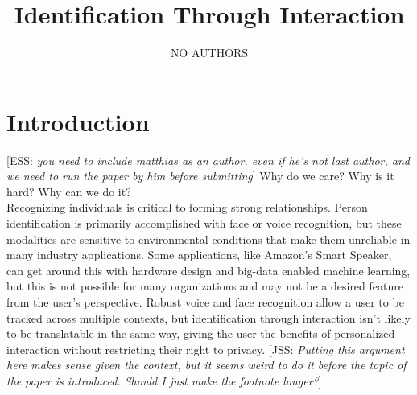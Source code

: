 \documentclass{article}
\title{Identification Through Interaction}
\author{NO AUTHORS} %
\date{\vspace{-1em}}
\newcommand{\elaine}[1]{{\textcolor[rgb]{0.1,0.4,0.6}{[ESS: {\it #1}]}}}
\newcommand{\meta}[1]{{\textcolor[rgb]{0.1,0.7,0.2}{[JSS: {\it #1}]}}}
\begin{document}
\maketitle


\section{Introduction}
\elaine{you need to include matthias as an author, even if he's not last author, and we need to run the paper by him before submitting}
Why do we care? Why is it hard? Why can we do it?\\

Recognizing individuals is critical to forming strong relationships. Person identification is primarily accomplished with face or voice recognition, but these modalities are sensitive to environmental conditions that make them unreliable in many industry applications. Some applications, like Amazon's Smart Speaker, can get around this with hardware design and big-data enabled machine learning, but this is not possible for many organizations and may not be a desired feature from the user's perspective. Robust voice and face recognition allow a user to be tracked across multiple contexts, but identification through interaction isn't likely to be translatable in the same way, giving the user the benefits of personalized interaction without restricting their right to privacy. \meta{Putting this argument here makes sense given the context, but it seems weird to do it before the topic of the paper is introduced. Should I just make the footnote longer?}

\end{document}
